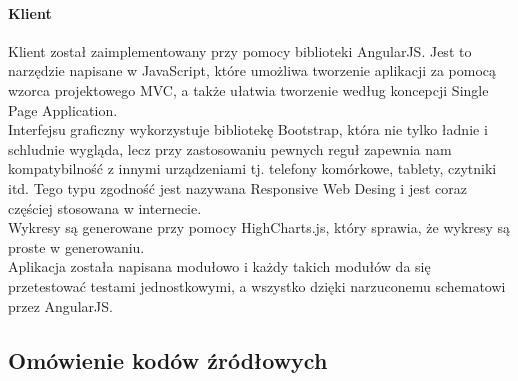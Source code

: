 \documentclass[10pt,titlepage]{article}
\begin{document}
\paragraph{Klient}
Klient został zaimplementowany przy pomocy biblioteki AngularJS. Jest to narzędzie napisane w JavaScript, które umożliwa tworzenie aplikacji za pomocą wzorca projektowego MVC, a także ułatwia tworzenie według koncepcji Single Page Application.\\ Interfejsu graficzny wykorzystuje bibliotekę Bootstrap, która nie tylko ładnie i schludnie wygląda, lecz przy zastosowaniu pewnych reguł zapewnia nam kompatybilność z innymi urządzeniami tj. telefony komórkowe, tablety, czytniki itd. Tego typu zgodność jest nazywana Responsive Web Desing i jest coraz częściej stosowana w internecie.\\ Wykresy są generowane przy pomocy HighCharts.js, który sprawia, że wykresy są proste w generowaniu.\\ Aplikacja została napisana modułowo i każdy takich modułów da się przetestować testami jednostkowymi, a wszystko dzięki narzuconemu schematowi przez AngularJS.
\subsection{Omówienie kodów źródłowych}
\end{document}
